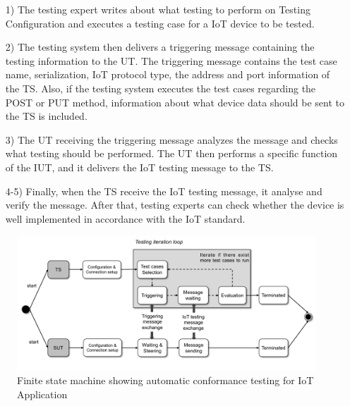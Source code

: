 \begin{enumerate}
    \item [1)] The testing expert writes about what testing to perform on Testing Configuration and executes a testing case for a IoT device to be tested.
    \item [2)] The testing system then delivers a triggering message containing the testing information to the UT. The triggering message contains the test case name, serialization, IoT protocol type, the address and port information of the TS. Also, if the testing system executes the test cases regarding the POST or PUT method, information about what device data should be sent to the TS is included.
    \item [3)]The UT receiving the triggering message analyzes the message and checks what testing should be performed. The UT then performs a specific function of the IUT, and it delivers the IoT testing message to the TS.
    \item [4-5)] Finally, when the TS receive the IoT testing message, it analyse and verify the message. After that, testing experts can check whether the device is well implemented in accordance with the IoT standard.
\end{enumerate}

\begin{figure}[H]			%
	\centering
	\includegraphics[width=\textwidth]{figures/fig_automated_testing_fsm.pdf}
    \caption{Finite state machine showing automatic conformance testing for IoT Application}
    \label{fig:finite_state_machine_for_conf_testing}
\end{figure}

